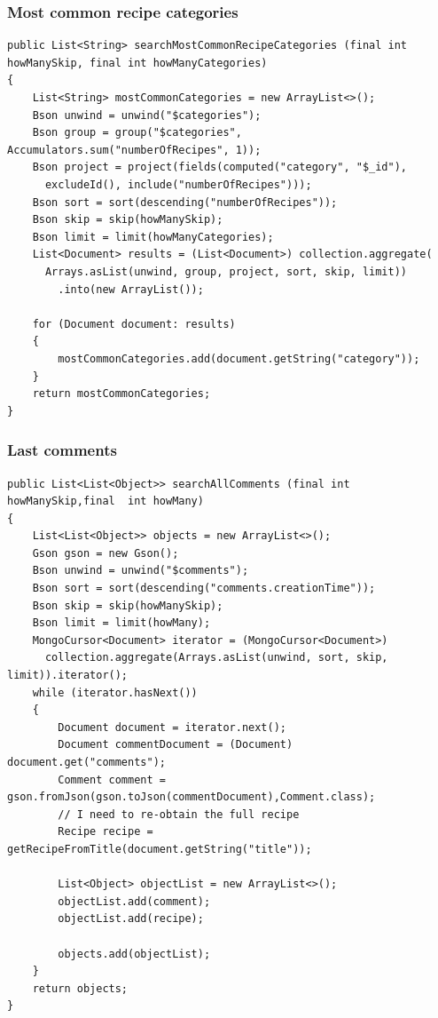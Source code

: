 \documentclass[a4paper]{report}
\begin{document}
\subsubsection{Most common recipe categories}
\lstset{language=code}
\begin{lstlisting}
public List<String> searchMostCommonRecipeCategories (final int howManySkip, final int howManyCategories)
{
    List<String> mostCommonCategories = new ArrayList<>();
    Bson unwind = unwind("$categories");
    Bson group = group("$categories", Accumulators.sum("numberOfRecipes", 1));
    Bson project = project(fields(computed("category", "$_id"), 
      excludeId(), include("numberOfRecipes")));
    Bson sort = sort(descending("numberOfRecipes"));
    Bson skip = skip(howManySkip);
    Bson limit = limit(howManyCategories);
    List<Document> results = (List<Document>) collection.aggregate(
      Arrays.asList(unwind, group, project, sort, skip, limit))
        .into(new ArrayList());

    for (Document document: results)
    {
        mostCommonCategories.add(document.getString("category"));
    }
    return mostCommonCategories;
}	
\end{lstlisting} 
\subsubsection{Last comments}
\lstset{language=code}
\begin{lstlisting}
public List<List<Object>> searchAllComments (final int howManySkip,final  int howMany)
{
	List<List<Object>> objects = new ArrayList<>();
	Gson gson = new Gson();
	Bson unwind = unwind("$comments");
	Bson sort = sort(descending("comments.creationTime"));
	Bson skip = skip(howManySkip);
	Bson limit = limit(howMany);
	MongoCursor<Document> iterator = (MongoCursor<Document>)
	  collection.aggregate(Arrays.asList(unwind, sort, skip, limit)).iterator();
	while (iterator.hasNext())
	{
		Document document = iterator.next();
		Document commentDocument = (Document) document.get("comments");
		Comment comment = gson.fromJson(gson.toJson(commentDocument),Comment.class);
		// I need to re-obtain the full recipe
		Recipe recipe = getRecipeFromTitle(document.getString("title"));

		List<Object> objectList = new ArrayList<>();
		objectList.add(comment);
		objectList.add(recipe);

		objects.add(objectList);
	}
	return objects;
}
\end{lstlisting} 
\end{document}
